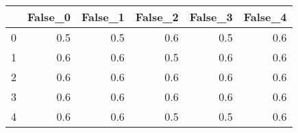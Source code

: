 \begin{tabular}{lrrrrr}
\toprule
{} &  False\_0 &  False\_1 &  False\_2 &  False\_3 &  False\_4 \\ \hline
\midrule
0 &      0.5 &      0.5 &      0.6 &      0.5 &      0.6 \\ \hline
1 &      0.6 &      0.6 &      0.5 &      0.6 &      0.6 \\ \hline
2 &      0.6 &      0.6 &      0.6 &      0.6 &      0.6 \\ \hline
3 &      0.6 &      0.6 &      0.6 &      0.6 &      0.6 \\ \hline
4 &      0.6 &      0.6 &      0.5 &      0.5 &      0.6 \\ \hline
\bottomrule
\end{tabular}
